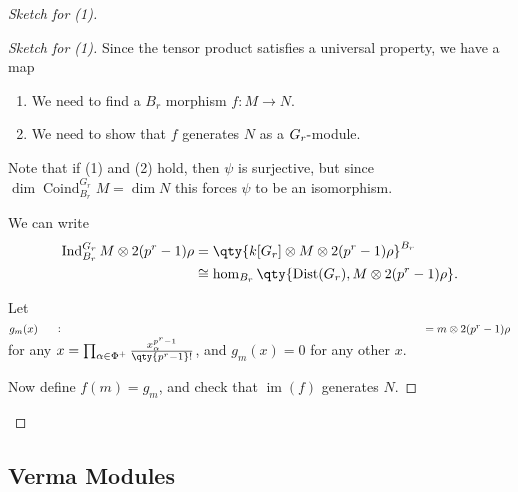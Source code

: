 \begin{proof}[Sketch for (1)]

\begin{proof}[Sketch for (1)]

Since the tensor product satisfies a universal property, we have a map

\begin{center}
\end{center}

\begin{enumerate}
\def\labelenumi{\arabic{enumi}.}
\item
  We need to find a \(B_r\) morphism \(f:M\to N\).
\item
  We need to show that \(f\) generates \(N\) as a
  \(G_r{\hbox{-}}\)module.
\end{enumerate}

Note that if (1) and (2) hold, then \(\psi\) is surjective, but since
\(\dim \operatorname{Coind}_{B_r}^{G_r} M= \dim N\) this forces \(\psi\)
to be an isomorphism.

We can write
\begin{align*}   \operatorname{Ind}_{B_r}^{G_r} M\otimes 2(p^r-1) \rho &= \qty{ k[G_r] \otimes M \otimes 2(p^r-1) \rho  }^{B_r} \\ &\cong \hom_{B_r}\qty{\operatorname{Dist}(G_r), M\otimes 2(p^r-1)\rho } .\end{align*}

Let \(g_m(x) \mathrel{\vcenter{:}}= m\otimes 2(p^r-1)\rho\) for any
\(x =\prod_{\alpha\in\Phi^+} {x_\alpha^{p^r-1} \over \qty{p^r-1}! }\),
and \(g_m(x) = 0\) for any other \(x\).

Now define \(f(m) = g_m\), and check that \(\operatorname{im}({f})\)
generates \(N\).

\end{proof}

\end{proof}

\hypertarget{verma-modules}{%
\subsection{Verma Modules}\label{verma-modules}}

